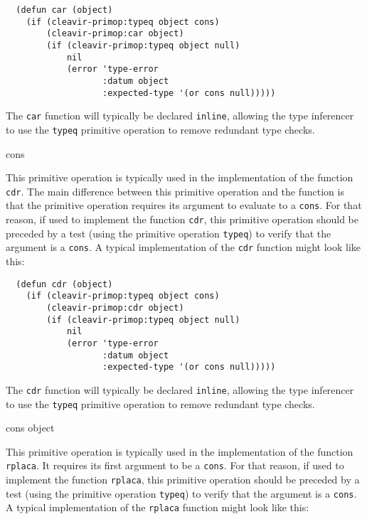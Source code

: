 \begin{verbatim}
  (defun car (object)
    (if (cleavir-primop:typeq object cons)
        (cleavir-primop:car object)
        (if (cleavir-primop:typeq object null)
            nil
            (error 'type-error
                   :datum object
                   :expected-type '(or cons null)))))
\end{verbatim}

The \commonlisp{} \texttt{car} function will typically be declared
\texttt{inline}, allowing the type inferencer
 to use the \texttt{typeq}
primitive operation to remove redundant type checks.

 {cons}

This primitive operation is typically used in the implementation of
the \commonlisp{} function \texttt{cdr}.  The main difference between
this primitive operation and the \commonlisp{} function is that the
primitive operation requires its argument to evaluate to a
\texttt{cons}.  For that reason, if used to implement the
\commonlisp{} function \texttt{cdr}, this primitive operation should
be preceded by a test (using the primitive operation \texttt{typeq})
to verify that the argument is a \texttt{cons}.  A typical
implementation of the \texttt{cdr} function might look like this:

\begin{verbatim}
  (defun cdr (object)
    (if (cleavir-primop:typeq object cons)
        (cleavir-primop:cdr object)
        (if (cleavir-primop:typeq object null)
            nil
            (error 'type-error
                   :datum object
                   :expected-type '(or cons null)))))
\end{verbatim}

The \commonlisp{} \texttt{cdr} function will typically be declared
\texttt{inline}, allowing the type inferencer
 to use the \texttt{typeq}
primitive operation to remove redundant type checks.

 {cons object}

This primitive operation is typically used in the implementation of
the \commonlisp{} function \texttt{rplaca}.  It requires its first
argument to be a \texttt{cons}.  For that reason, if used to implement
the \commonlisp{} function \texttt{rplaca}, this primitive operation
should be preceded by a test (using the primitive operation
\texttt{typeq}) to verify that the argument is a \texttt{cons}.  A
typical implementation of the \texttt{rplaca} function might look like
this:


